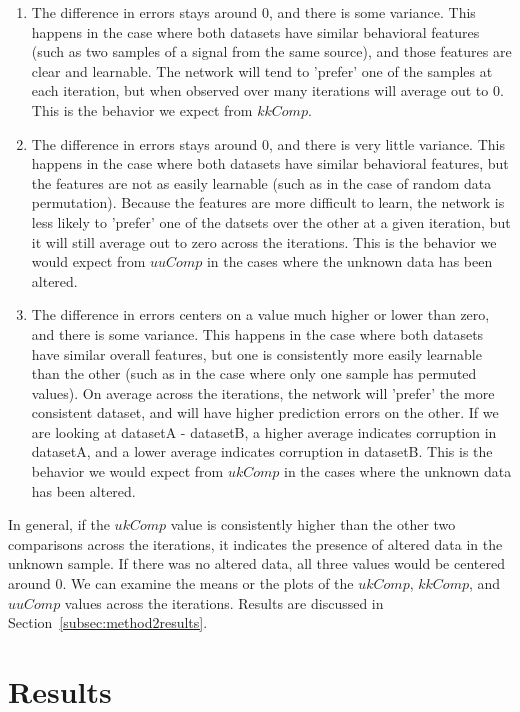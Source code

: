 \documentclass{acm_proc_article-sp}
\begin{document}
  \begin{enumerate}
    \item The difference in errors stays around 0, and there is some variance. This happens in the case where both datasets have similar behavioral features (such as two samples of a signal from the same source), and those features are clear and learnable. The network will tend to 'prefer' one of the samples at each iteration, but when observed over many iterations will average out to 0. This is the behavior we expect from $kkComp$.
    \item The difference in errors stays around 0, and there is very little variance. This happens in the case where both datasets have similar behavioral features, but the features are not as easily learnable (such as in the case of random data permutation). Because the features are more difficult to learn, the network is less likely to 'prefer' one of the datsets over the other at a given iteration, but it will still average out to zero across the iterations. This is the behavior we would expect from $uuComp$ in the cases where the unknown data has been altered.
    \item The difference in errors centers on a value much higher or lower than zero, and there is some variance. This happens in the case where both datasets have similar overall features, but one is consistently more easily learnable than the other (such as in the case where only one sample has permuted values). On average across the iterations, the network will 'prefer' the more consistent dataset, and will have higher prediction errors on the other. If we are looking at datasetA - datasetB, a higher average indicates corruption in datasetA, and a lower average indicates corruption in datasetB. This is the behavior we would expect from $ukComp$ in the cases where the unknown data has been altered.
  \end{enumerate}

  In general, if the $ukComp$ value is consistently higher than the other two comparisons across the iterations, it indicates the presence of altered data in the unknown sample. If there was no altered data, all three values would be centered around 0. We can examine the means or the plots of the $ukComp$, $kkComp$, and $uuComp$ values across the iterations. Results are discussed in Section~\ref{subsec:method2results}.

  \section{Results}
  \label{sec:results}
\end{document}
